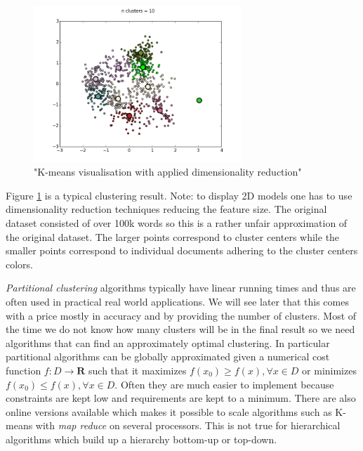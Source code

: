     \begin{figure}[h!]
      \centering
        \includegraphics[width=0.7\textwidth]{kmeans_clustering.png}
        \caption{"K-means visualisation with applied dimensionality reduction"}
        \label{kmeans_clustering}
    \end{figure}

    Figure \ref{kmeans_clustering} is a typical clustering result. Note: to display 2D models one has to use dimensionality reduction techniques reducing the feature size. The original dataset consisted of over 100k words so this is a rather unfair approximation of the original dataset. The larger points correspond to cluster centers while the smaller points correspond to individual documents adhering to the cluster centers colors. 

    \emph{Partitional clustering} algorithms typically have linear running times and thus are often used in practical real world applications. We will see later that this comes with a price mostly in accuracy and by providing the number of clusters. Most of the time we do not know how many clusters will be in the final result so we need algorithms that can find an approximately optimal clustering. In particular partitional algorithms can be globally approximated given a numerical cost function $f:D \to \mathbf{R}$ such that it maximizes $f(x_0) \geq f(x), \forall x \in D$  or minimizes $f(x_0) \leq f(x), \forall x \in D$. Often they are much easier to implement because constraints are kept low and requirements are kept to a minimum. There are also online versions available which makes it possible to scale algorithms such as K-means with \emph{map reduce} on several processors. This is not true for hierarchical algorithms which build up a hierarchy bottom-up or top-down.

